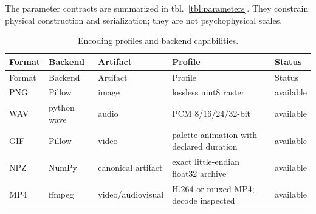 \documentclass[
  english,
]{article}
\begin{document}
The parameter contracts are summarized in tbl.~\ref{tbl:parameters}.
They constrain physical construction and serialization; they are not
psychophysical scales.

\begin{longtable}[]{@{}
  >{\raggedright\arraybackslash}p{}
  >{\raggedright\arraybackslash}p{}
  >{\raggedright\arraybackslash}p{}
  >{\raggedright\arraybackslash}p{}
  >{\raggedright\arraybackslash}p{}@{}}
\caption{Encoding profiles and backend
capabilities.}\label{tbl:encodings}\tabularnewline
\toprule\noalign{}
\begin{minipage}[b]{\linewidth}\raggedright
Format
\end{minipage} & \begin{minipage}[b]{\linewidth}\raggedright
Backend
\end{minipage} & \begin{minipage}[b]{\linewidth}\raggedright
Artifact
\end{minipage} & \begin{minipage}[b]{\linewidth}\raggedright
Profile
\end{minipage} & \begin{minipage}[b]{\linewidth}\raggedright
Status
\end{minipage} \\
\midrule\noalign{}
\endfirsthead
\toprule\noalign{}
\begin{minipage}[b]{\linewidth}\raggedright
Format
\end{minipage} & \begin{minipage}[b]{\linewidth}\raggedright
Backend
\end{minipage} & \begin{minipage}[b]{\linewidth}\raggedright
Artifact
\end{minipage} & \begin{minipage}[b]{\linewidth}\raggedright
Profile
\end{minipage} & \begin{minipage}[b]{\linewidth}\raggedright
Status
\end{minipage} \\
\midrule\noalign{}
\endhead
\bottomrule\noalign{}
\endlastfoot
PNG & Pillow & image & lossless uint8 raster & available \\
WAV & python wave & audio & PCM 8/16/24/32-bit & available \\
GIF & Pillow & video & palette animation with declared duration &
available \\
NPZ & NumPy & canonical artifact & exact little-endian float32 archive &
available \\
MP4 & ffmpeg & video/audiovisual & H.264 or muxed MP4; decode inspected
& available \\
\end{longtable}
\end{document}
